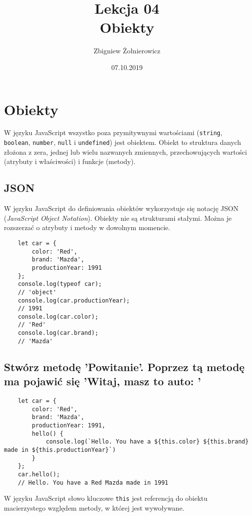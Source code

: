 \documentclass[a4paper]{article}
\begin{document}
\title{{\huge Lekcja 04} \\
    {\Large Obiekty}}
\author{Zbigniew Żołnierowicz}
\date{07.10.2019}
\maketitle
\section{Obiekty}
W języku JavaScript wszystko poza prymitywnymi wartościami ({\tt string}, {\tt boolean}, {\tt number}, {\tt null} i {\tt undefined}) jest obiektem. Obiekt to struktura danych złożona z zera, jednej lub wielu nazwanych zmiennych, przechowujących wartości (atrybuty i właściwości) i funkcje (metody).

\subsection*{JSON}
W języku JavaScript do definiowania obiektów wykorzystuje się notację JSON (\emph{JavaScript Object Notation}). Obiekty nie są strukturami stałymi. Można je rozszerzać o atrybuty i metody w dowolnym momencie.
\begin{verbatim}
    let car = {
        color: 'Red',
        brand: 'Mazda',
        productionYear: 1991
    };
    console.log(typeof car);
    // 'object'
    console.log(car.productionYear);
    // 1991
    console.log(car.color);
    // 'Red'
    console.log(car.brand);
    // 'Mazda'
\end{verbatim}
\pagebreak
\subsection*{Stwórz metodę 'Powitanie'. Poprzez tą metodę ma pojawić się 'Witaj, masz to auto: '}
\begin{verbatim}
    let car = {
        color: 'Red',
        brand: 'Mazda',
        productionYear: 1991,
        hello() {
            console.log(`Hello. You have a ${this.color} ${this.brand} made in ${this.productionYear}`)
        }
    };
    car.hello();
    // Hello. You have a Red Mazda made in 1991
\end{verbatim}
W języku JavaScript słowo kluczowe {\tt this} jest referencją do obiektu macierzystego względem metody, w której jest wywoływane.
\end{document}
